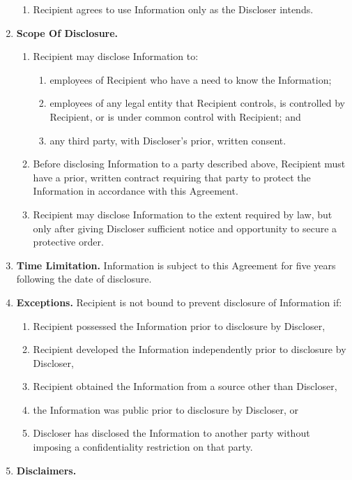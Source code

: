 \documentclass[12pt]{article}
\begin{document}
\begin{enumerate}
\begin{enumerate}
      \item Recipient agrees to use Information only as the Discloser intends.
    \end{enumerate}
  \item {\bf Scope Of Disclosure.}
    \begin{enumerate}\itemsep2pt
      \item Recipient may disclose Information to:
      \begin{enumerate}\itemsep2pt
        \item employees of Recipient who have a need to know the Information;
        \item employees of any legal entity that Recipient controls, is controlled by Recipient, or is under common control with Recipient; and
        \item any third party, with Discloser's prior, written consent.
      \end{enumerate}
      \item Before disclosing Information to a party described above, Recipient must have a prior, written contract requiring that party to protect the Information in accordance with this Agreement.
      \item Recipient may disclose Information to the extent required by law, but only after giving Discloser sufficient notice and opportunity to secure a protective order.
    \end{enumerate}
  \item {\bf Time Limitation.} Information is subject to this Agreement for five years following the date of disclosure.
  \item {\bf Exceptions.} Recipient is not bound to prevent disclosure of Information if:
    \begin{enumerate}\itemsep2pt
      \item Recipient possessed the Information prior to disclosure by Discloser,
      \item Recipient developed the Information independently prior to disclosure by Discloser,
      \item Recipient obtained the Information from a source other than Discloser,
      \item the Information was public prior to disclosure by Discloser, or
      \item Discloser has disclosed the Information to another party without imposing a confidentiality restriction on that party.
    \end{enumerate}
  \item {\bf Disclaimers.}

\end{enumerate}
\end{document}
